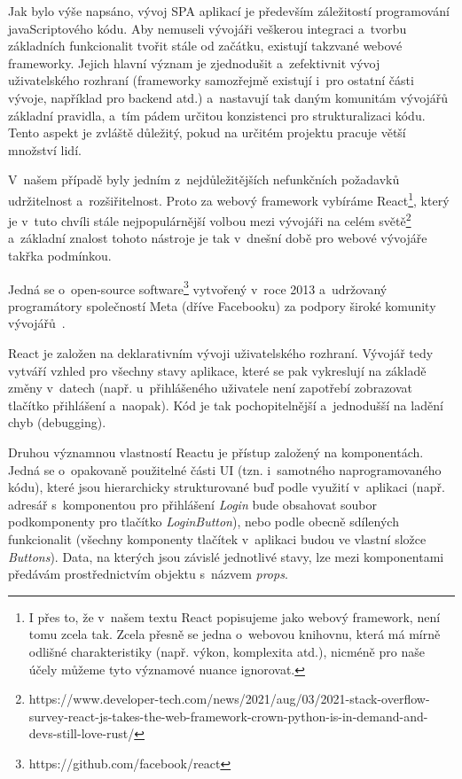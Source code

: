 Jak bylo výše napsáno, vývoj SPA aplikací je především záležitostí programování javaScriptového kódu. Aby nemuseli vývojáři veškerou integraci a~tvorbu základních funkcionalit tvořit stále od začátku, existují takzvané webové frameworky. Jejich hlavní význam je zjednodušit a~zefektivnit vývoj uživatelského rozhraní (frameworky samozřejmě existují i~pro ostatní části vývoje, například pro backend atd.) a~nastavují tak daným komunitám vývojářů základní pravidla, a~tím pádem určitou konzistenci pro strukturalizaci kódu. Tento aspekt je zvláště důležitý, pokud na určitém projektu pracuje větší množství lidí.

V~našem případě byly jedním z~nejdůležitějších nefunkčních požadavků udržitelnost a~rozšiřitelnost. Proto za webový framework vybíráme React\footnote{I přes to, že v~našem textu React popisujeme jako webový framework, není tomu zcela tak. Zcela přesně se jedna o~webovou knihovnu, která má mírně odlišné charakteristiky (např. výkon, komplexita atd.), nicméně pro naše účely můžeme tyto významové nuance ignorovat.}, který je v~tuto chvíli stále nejpopulárnější volbou mezi vývojáři na celém světě\footnote{https://www.developer-tech.com/news/2021/aug/03/2021-stack-overflow-survey-react-js-takes-the-web-framework-crown-python-is-in-demand-and-devs-still-love-rust/} a~základní znalost tohoto nástroje je tak v~dnešní době pro webové vývojáře takřka podmínkou.

Jedná se o~open-source software\footnote{https://github.com/facebook/react} vytvořený v~roce 2013 a~udržovaný programátory společností Meta (dříve Facebooku) za podpory široké komunity vývojářů~\parencite{react}.

React je založen na deklarativním vývoji uživatelského rozhraní. Vývojář tedy vytváří vzhled pro všechny stavy aplikace, které se pak vykreslují na základě změny v~datech (např. u~přihlášeného uživatele není zapotřebí zobrazovat tlačítko přihlášení a~naopak). Kód je tak pochopitelnější a~jednodušší na ladění chyb (debugging).

Druhou významnou vlastností Reactu je přístup založený na komponentách. Jedná se o~opakovaně použitelné části UI (tzn. i~samotného naprogramovaného kódu), které jsou hierarchicky strukturované buď podle využití v~aplikaci (např. adresář s~komponentou pro přihlášení \emph{Login} bude obsahovat soubor podkomponenty pro tlačítko \emph{LoginButton}), nebo podle obecně sdílených funkcionalit (všechny komponenty tlačítek v~aplikaci budou ve vlastní složce \emph{Buttons}). Data, na kterých jsou závislé jednotlivé stavy, lze mezi komponentami předávám prostřednictvím objektu s~názvem \emph{props}.

